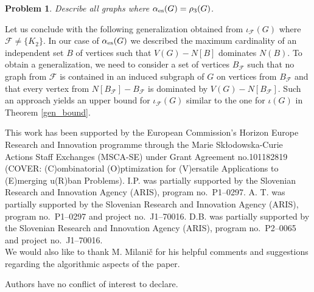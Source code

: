 \documentclass[11pt]{article}
\newtheorem{problem}[theorem]{Problem}
\newcommand{\io}{\iota}
\newcommand{\es}{\alpha_{\rm es}}
\newcommand{\ip}[1]{{\color{blue}#1}}%
\newcommand{\db}[1]{{\color{orange}#1}}%
\begin{document}
\begin{problem}
Describe all graphs where $\es(G)=\rho_3(G)$.
\end{problem}

Let us conclude with the following generalization obtained from $\io_{\mathcal{F}}(G)$ where $\mathcal{F}\neq\{K_2\}$. In our case of $\es(G)$ we described the maximum cardinality of an independent set $B$ of vertices such that $V(G)-N[B]$ dominates $N(B)$. To obtain a generalization, we need to consider a set of vertices $B_{\mathcal{F}}$ such that no graph from $\mathcal{F}$ is contained in an induced subgraph of $G$ on vertices from $B_{\mathcal{F}}$ and that every vertex from $N[B_{\mathcal{F}}]-B_{\mathcal{F}}$ is dominated by $V(G)-N[B_{\mathcal{F}}]$. Such an approach yields an upper bound for $\io_{\mathcal{F}}(G)$ similar to the one for $\io(G)$ in Theorem \ref{gen_bound}.   

\vskip 1pc  
This work has been supported by the European Commission's Horizon Europe Research and Innovation programme through the Marie Skłodowska-Curie Actions Staff Exchanges (MSCA-SE) under Grant Agreement no.101182819 (COVER: (C)ombinatorial (O)ptimization for (V)ersatile Applications to (E)merging u(R)ban Problems).
I.P. was partially supported by the Slovenian Research and Innovation Agency (ARIS), program no.~P1--0297. 
A. T. was partially supported by the Slovenian Research and Innovation Agency (ARIS), program no.~P1--0297 and project no.~J1--70016. 
D.B. was partially supported by the Slovenian Research and Innovation Agency (ARIS), program no.~P2--0065 and project no.~J1--70016.\\
We would also like to thank M. Milani\v c for his helpful comments and suggestions regarding the algorithmic aspects of the paper.%


\vskip 1pc 
Authors have no conflict of interest to declare.





\end{document}
